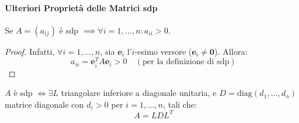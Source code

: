 \paragraph{Ulteriori Proprietà delle Matrici sdp}

\begin{teorema}
Se $A=(a_{ij})$ è sdp $\implies \forall i=1, \dots, n: a_{ii} > 0$.
\end{teorema}
\begin{proof}
Infatti, $\forall i=1, \dots, n$, sia $\mathbf{e}_i$ l'$i$-esimo versore ($\mathbf{e}_i \neq \mathbf{0}$). Allora:
$$ a_{ii} = \mathbf{e}_i^T A \mathbf{e}_i > 0 \quad (\text{per la definizione di sdp}) $$
\end{proof}

\begin{teorema}
$A$ è sdp $\iff \exists L$ triangolare inferiore a diagonale unitaria, e $D = \text{diag}(d_1, \dots, d_n)$ matrice diagonale con $d_i > 0$ per $i=1, \dots, n$, tali che:
$$ A = L D L^T $$
\end{teorema}
